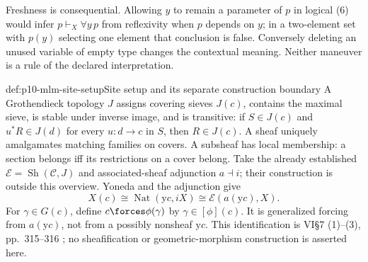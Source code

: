 Freshness is consequential. Allowing \(y\) to remain a parameter of \(p\)
in logical (6) would infer \(p\vdash_X\forall y\,p\) from reflexivity when
\(p\) depends on \(y\); in a two-element set with \(p(y)\) selecting one
element that conclusion is false. Conversely deleting an unused variable
of empty type changes the contextual meaning. Neither maneuver is a rule
of the declared interpretation.

\begin{hbdefinition}{def:p10-mlm-site-setup}{Site setup and its separate construction boundary}
A Grothendieck topology \(J\) assigns covering sieves \(J(c)\), contains the
maximal sieve, is stable under inverse image, and is transitive: if \(S\in J(c)\)
and \(u^*R\in J(d)\) for every \(u:d\to c\) in \(S\), then \(R\in J(c)\).
A sheaf uniquely amalgamates matching families on covers. A subsheaf has
local membership: a section belongs iff its restrictions on a cover belong.
Take the already established \(\mathcal E=\operatorname{Sh}(\mathcal C,J)\)
and associated-sheaf adjunction \(a\dashv i\); their construction is outside
this overview. Yoneda and the adjunction give
\[
 X(c)\cong\operatorname{Nat}(\mathrm yc,iX)\cong\mathcal E(a(\mathrm yc),X).
\]
For \(\gamma\in G(c)\), define \(c\forces\phi(\gamma)\) by
\(\gamma\in[\phi](c)\). It is generalized forcing from \(a(\mathrm yc)\),
not from a possibly nonsheaf \(\mathrm yc\). This identification is VI\S7
(1)--(3), pp.~315--316 \cite{MacLaneMoerdijk1992}; no sheafification or
geometric-morphism construction is asserted here.
\end{hbdefinition}

